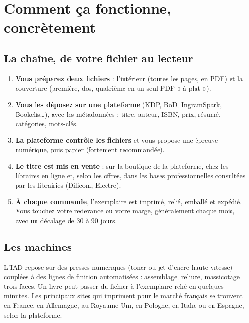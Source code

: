 \section{Comment ça fonctionne, concrètement}

\subsection{La chaîne, de votre fichier au lecteur}

\begin{enumerate}
  \item \textbf{Vous préparez deux fichiers} : l’intérieur (toutes les
        pages, en PDF) et la couverture (première, dos, quatrième en un
        seul PDF « à plat »).
  \item \textbf{Vous les déposez sur une plateforme} (KDP, BoD,
        IngramSpark, Bookelis…), avec les métadonnées : titre, auteur,
        ISBN, prix, résumé, catégories, mots-clés.
  \item \textbf{La plateforme contrôle les fichiers} et vous propose une
        épreuve numérique, puis papier (fortement recommandée).
  \item \textbf{Le titre est mis en vente} : sur la boutique de la
        plateforme, chez les libraires en ligne et, selon les offres,
        dans les bases professionnelles consultées par les librairies
        (Dilicom, Electre).
  \item \textbf{À chaque commande}, l’exemplaire est imprimé, relié,
        emballé et expédié. Vous touchez votre redevance ou votre marge,
        généralement chaque mois, avec un décalage de 30 à 90 jours.
\end{enumerate}

\subsection{Les machines}

L’IAD repose sur des presses numériques (toner ou jet d’encre haute
vitesse) couplées à des lignes de finition automatisées : assemblage,
reliure, massicotage trois faces. Un livre peut passer du fichier à
l’exemplaire relié en quelques minutes. Les principaux sites qui
impriment pour le marché français se trouvent en France, en Allemagne,
au Royaume-Uni, en Pologne, en Italie ou en Espagne, selon la plateforme.

